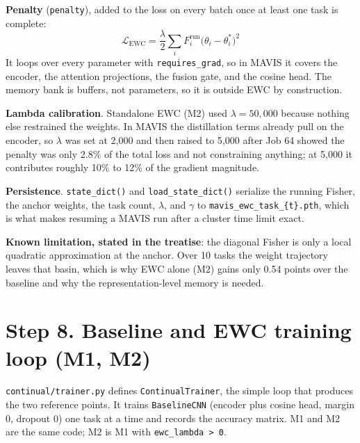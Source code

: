 \documentclass[11pt,a4paper]{article}
\newcommand{\code}[1]{\texttt{#1}}
\begin{document}
\textbf{Penalty} (\code{penalty}), added to the loss on every batch once at least one task is complete:
\begin{equation}
\mathcal{L}_{\mathrm{EWC}} = \frac{\lambda}{2} \sum_i F^{\mathrm{run}}_i \big(\theta_i - \theta_i^{*}\big)^2
\end{equation}
It loops over every parameter with \code{requires\_grad}, so in MAVIS it covers the encoder, the attention projections, the fusion gate, and the cosine head. The memory bank is buffers, not parameters, so it is outside EWC by construction.

\textbf{Lambda calibration}. Standalone EWC (M2) used $\lambda = 50{,}000$ because nothing else restrained the weights. In MAVIS the distillation terms already pull on the encoder, so $\lambda$ was set at 2{,}000 and then raised to 5{,}000 after Job 64 showed the penalty was only 2.8\% of the total loss and not constraining anything; at 5{,}000 it contributes roughly 10\% to 12\% of the gradient magnitude.

\textbf{Persistence}. \code{state\_dict()} and \code{load\_state\_dict()} serialize the running Fisher, the anchor weights, the task count, $\lambda$, and $\gamma$ to \code{mavis\_ewc\_task\_\{t\}.pth}, which is what makes resuming a MAVIS run after a cluster time limit exact.

\textbf{Known limitation, stated in the treatise}: the diagonal Fisher is only a local quadratic approximation at the anchor. Over 10 tasks the weight trajectory leaves that basin, which is why EWC alone (M2) gains only 0.54 points over the baseline and why the representation-level memory is needed.

\section{Step 8. Baseline and EWC training loop (M1, M2)}

\code{continual/trainer.py} defines \code{ContinualTrainer}, the simple loop that produces the two reference points. It trains \code{BaselineCNN} (encoder plus cosine head, margin 0, dropout 0) one task at a time and records the accuracy matrix. M1 and M2 are the same code; M2 is M1 with \code{ewc\_lambda > 0}.
\end{document}
